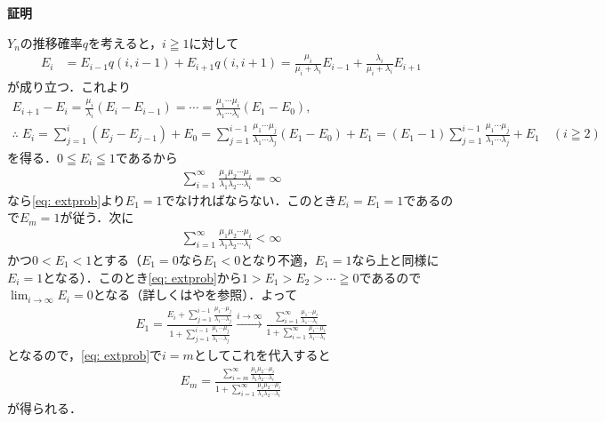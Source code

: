 \documentclass[dvipdfmx]{jsarticle}
\makeatletter
\numberwithin{equation}{section}
\theoremstyle{definition}
\renewenvironment{proof}[1][\proofname]{\par
  \pushQED{\qed}%
  \normalfont \topsep6\p@\@plus6\p@\relax
  \trivlist
  \item\relax
  {\bfseries
  #1\@addpunct{.}}\hspace\labelsep\ignorespaces
}{%
  \popQED\endtrivlist\@endpefalse
}
\renewcommand{\proofname}{証明}
\newcommand{\0}{\bm{0}}
\newcommand{\1}{\bm{1}}
\makeatother
\begin{document}
\begin{proof}
  $Y_n$の推移確率$q$を考えると，$i\geqq1$に対して
  \begin{align}
    E_i &= E_{i-1} q(i,i-1) + E_{i+1} q(i,i+1)
    = \frac{\mu_i}{\mu_i + \lambda_i} E_{i-1} + \frac{\lambda_i}{\mu_i + \lambda_i} E_{i+1}
  \end{align}
  が成り立つ．これより
  \begin{gather}
    E_{i+1} - E_i = \frac{\mu_i}{\lambda_i} (E_i - E_{i-1})
    = \cdots = \frac{\mu_1 \cdots \mu_i}{\lambda_1 \cdots \lambda_i} (E_1 - E_0), \\
    \therefore \; E_i = \sum_{j=1}^i (E_j - E_{j-1}) + E_0 
    = \sum_{j=1}^{i-1} \frac{\mu_1 \cdots \mu_j}{\lambda_1 \cdots \lambda_j} (E_1 - E_0) + E_1 
    = (E_1 - 1) \sum_{j=1}^{i-1} \frac{\mu_1 \cdots \mu_j}{\lambda_1 \cdots \lambda_j} + E_1 \quad (i \geqq 2) \label{eq: extprob}
  \end{gather}
  を得る．$0 \leqq E_i \leqq 1$であるから
  \begin{align}
    \sum_{i=1}^{\infty} \frac{\mu_1 \mu_2 \cdots \mu_i}{\lambda_1 \lambda_2 \cdots \lambda_i} = \infty
  \end{align}
  なら\eqref{eq: extprob}より$E_1 = 1$でなければならない．このとき$E_i = E_1 = 1$であるので$E_m = 1$が従う．次に
  \begin{align}
    \sum_{i=1}^{\infty} \frac{\mu_1 \mu_2 \cdots \mu_i}{\lambda_1 \lambda_2 \cdots \lambda_i} < \infty
  \end{align}
  かつ$0 < E_1 < 1$とする（$E_1 = 0$なら$E_1 < 0$となり不適，$E_1 = 1$なら上と同様に$E_i = 1$となる）．このとき\eqref{eq: extprob}から$1 > E_1 > E_2 > \cdots \geqq 0$であるので$\lim_{i \to \infty} E_i = 0$となる（詳しくは\cite{web}や\cite{Nisbet}を参照）．よって
  \begin{align}
    E_1 = \frac{E_i + \sum_{j=1}^{i-1} \frac{\mu_1 \cdots \mu_j}{\lambda_1 \cdots \lambda_j}}{1 + \sum_{j=1}^{i-1} \frac{\mu_1 \cdots \mu_j}{\lambda_1 \cdots \lambda_j}}
    \xrightarrow{i \to \infty} \frac{\sum_{i=1}^{\infty} \frac{\mu_1 \cdots \mu_i}{\lambda_1 \cdots \lambda_i}}{1 + \sum_{i=1}^{\infty} \frac{\mu_1 \cdots \mu_i}{\lambda_1 \cdots \lambda_i}}
  \end{align}
  となるので，\eqref{eq: extprob}で$i = m$としてこれを代入すると
  \begin{align}
    E_m = \frac{\sum_{i=m}^{\infty} \frac{\mu_1 \mu_2 \cdots \mu_i}{\lambda_1 \lambda_2 \cdots \lambda_i}}{1 + \sum_{i=1}^{\infty} \frac{\mu_1 \mu_2 \cdots \mu_i}{\lambda_1 \lambda_2 \cdots \lambda_i}}
  \end{align}
  が得られる．
\end{proof}
\end{document}
